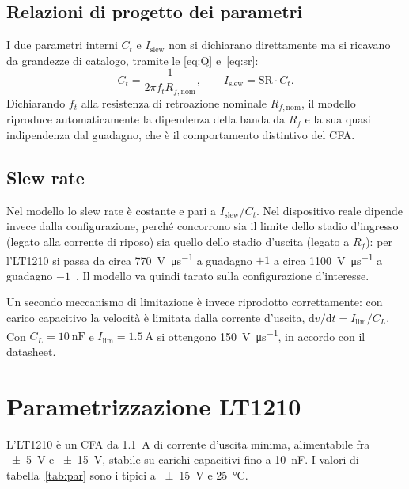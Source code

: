 \documentclass[11pt,a4paper]{article}
\begin{document}
\subsection{Relazioni di progetto dei parametri}

I due parametri interni $C_t$ e $I_{\mathrm{slew}}$ non si dichiarano
direttamente ma si ricavano da grandezze di catalogo, tramite le
\eqref{eq:Q} e~\eqref{eq:sr}:
\begin{equation}
  C_t = \frac{1}{2\pi f_t R_{f,\mathrm{nom}}},
  \qquad
  I_{\mathrm{slew}} = \mathrm{SR}\cdot C_t .
\end{equation}
Dichiarando $f_t$ alla resistenza di retroazione nominale
$R_{f,\mathrm{nom}}$, il modello riproduce automaticamente la dipendenza
della banda da $R_f$ e la sua quasi indipendenza dal guadagno, che è il
comportamento distintivo del CFA.

\subsection{Slew rate}

Nel modello lo slew rate è costante e pari a $I_{\mathrm{slew}}/C_t$. Nel
dispositivo reale dipende invece dalla configurazione, perché concorrono
sia il limite dello stadio d'ingresso (legato alla corrente di riposo) sia
quello dello stadio d'uscita (legato a $R_f$): per l'LT1210 si passa da
circa \SI{770}{\volt\per\micro\second} a guadagno $+1$ a circa
\SI{1100}{\volt\per\micro\second} a guadagno $-1$~\cite{ltdatasheet}. Il
modello va quindi tarato sulla configurazione d'interesse.

Un secondo meccanismo di limitazione è invece riprodotto correttamente:
con carico capacitivo la velocità è limitata dalla corrente d'uscita,
$\mathrm{d}v/\mathrm{d}t = I_{\mathrm{lim}}/C_L$. Con
$C_L = \SI{10}{\nano\farad}$ e $I_{\mathrm{lim}}=\SI{1.5}{\ampere}$ si
ottengono \SI{150}{\volt\per\micro\second}, in accordo con il datasheet.

\section{Parametrizzazione LT1210}

L'LT1210 è un CFA da \SI{1.1}{\ampere} di corrente d'uscita minima,
alimentabile fra \SI{\pm5}{\volt} e \SI{\pm15}{\volt}, stabile su carichi
capacitivi fino a \SI{10}{\nano\farad}. I valori di
tabella~\ref{tab:par} sono i tipici a \SI{\pm15}{\volt} e \SI{25}{\celsius}.
\end{document}

